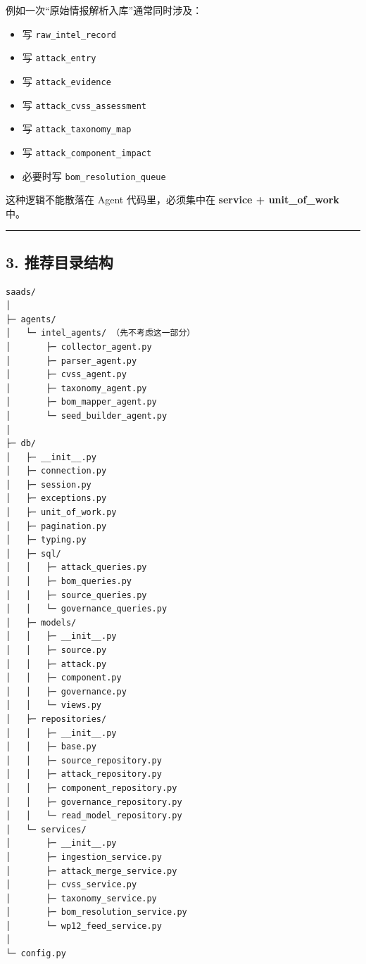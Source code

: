 \documentclass[UTF8]{ctexart}
\providecommand{\tightlist}{%
  \setlength{\itemsep}{0pt}\setlength{\parskip}{0pt}}
\begin{document}
例如一次``原始情报解析入库''通常同时涉及：

\begin{itemize}
\tightlist
\item
  写 \texttt{raw\_intel\_record}
\item
  写 \texttt{attack\_entry}
\item
  写 \texttt{attack\_evidence}
\item
  写 \texttt{attack\_cvss\_assessment}
\item
  写 \texttt{attack\_taxonomy\_map}
\item
  写 \texttt{attack\_component\_impact}
\item
  必要时写 \texttt{bom\_resolution\_queue}
\end{itemize}

这种逻辑不能散落在 Agent 代码里，必须集中在 \textbf{service +
unit\_of\_work} 中。

\begin{center}\rule{0.5\linewidth}{0.5pt}\end{center}

\hypertarget{ux63a8ux8350ux76eeux5f55ux7ed3ux6784}{%
\subsection{3.
推荐目录结构}\label{ux63a8ux8350ux76eeux5f55ux7ed3ux6784}}

\begin{verbatim}
saads/
│
├─ agents/
│   └─ intel_agents/ （先不考虑这一部分）
│       ├─ collector_agent.py
│       ├─ parser_agent.py
│       ├─ cvss_agent.py
│       ├─ taxonomy_agent.py
│       ├─ bom_mapper_agent.py
│       └─ seed_builder_agent.py
│
├─ db/
│   ├─ __init__.py
│   ├─ connection.py
│   ├─ session.py
│   ├─ exceptions.py
│   ├─ unit_of_work.py
│   ├─ pagination.py
│   ├─ typing.py
│   ├─ sql/
│   │   ├─ attack_queries.py
│   │   ├─ bom_queries.py
│   │   ├─ source_queries.py
│   │   └─ governance_queries.py
│   ├─ models/
│   │   ├─ __init__.py
│   │   ├─ source.py
│   │   ├─ attack.py
│   │   ├─ component.py
│   │   ├─ governance.py
│   │   └─ views.py
│   ├─ repositories/
│   │   ├─ __init__.py
│   │   ├─ base.py
│   │   ├─ source_repository.py
│   │   ├─ attack_repository.py
│   │   ├─ component_repository.py
│   │   ├─ governance_repository.py
│   │   └─ read_model_repository.py
│   └─ services/
│       ├─ __init__.py
│       ├─ ingestion_service.py
│       ├─ attack_merge_service.py
│       ├─ cvss_service.py
│       ├─ taxonomy_service.py
│       ├─ bom_resolution_service.py
│       └─ wp12_feed_service.py
│
└─ config.py
\end{verbatim}
\end{document}
